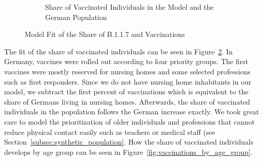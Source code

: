 \begin{figure}[ht]
\begin{subfigure}[b]{0.425\textwidth}
    \caption{Share of Vaccinated Individuals in the Model and the German Population}
    \label{fig:fit_vaccinations}
  \end{subfigure}
  \caption{Model Fit of the Share of B.1.1.7 and Vaccinations}
\end{figure}

The fit of the share of vaccinated individuals can be seen in
Figure~\ref{fig:fit_vaccinations}. In Germany, vaccines were rolled out according to four
priority groups. The first vaccines were mostly reserved for nursing homes and some
selected professions such as first responders. Since we do not have nursing home
inhabitants in our model, we subtract the first percent of vaccinations which is
equivalent to the share of Germans living in nursing homes. Afterwards, the share of
vaccinated individuals in the population follows the German increase exactly. We took
great care to model the prioritization of older individuals and professions that cannot
reduce physical contact easily such as teachers or medical staff (see
Section~\ref{subsec:synthetic_population}. How the share of vaccinated individuals
develops by age group can be seen in Figure~\ref{fig:vaccinations_by_age_group}.

\FloatBarrier

